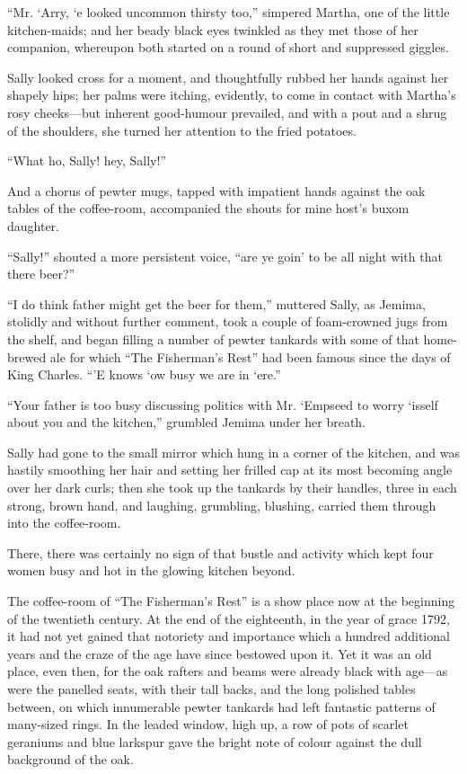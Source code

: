 \documentclass[paper=5.5in:8.5in,BCOR=7mm,twoside,DIV=calc,12pt,usegeometry,chapterprefix,endperiod,headings=big]{scrbook}
\begin{document}
\enquote{Mr. `Arry, `e looked uncommon thirsty too,} simpered Martha, one of the little kitchen-maids; and her beady black eyes twinkled as they met those of her companion, whereupon both started on a round of short and suppressed giggles.

Sally looked cross for a moment, and thoughtfully rubbed her hands against her shapely hips; her palms were itching, evidently, to come in contact with Martha's rosy cheeks---but inherent good-humour prevailed, and with a pout and a shrug of the shoulders, she turned her attention to the fried potatoes.

\enquote{What ho, Sally! hey, Sally!}

And a chorus of pewter mugs, tapped with impatient hands against the oak tables of the coffee-room, accompanied the shouts for mine host's buxom daughter.

\enquote{Sally!} shouted a more persistent voice, \enquote{are ye goin’ to be all night with that there beer?}

\enquote{I do think father might get the beer for them,} muttered Sally, as Jemima, stolidly and without further comment, took a couple of foam-crowned jugs from the shelf, and began filling a number of pewter tankards with some of that home-brewed ale for which \enquote{The Fisherman's Rest} had been famous since the days of King Charles. \enquote{’E knows `ow busy we are in `ere.}

\enquote{Your father is too busy discussing politics with Mr. `Empseed to worry `isself about you and the kitchen,} grumbled Jemima under her breath.

Sally had gone to the small mirror which hung in a corner of the kitchen, and was hastily smoothing her hair and setting her frilled cap at its most becoming angle over her dark curls; then she took up the tankards by their handles, three in each strong, brown hand, and laughing, grumbling, blushing, carried them through into the coffee-room.

There, there was certainly no sign of that bustle and activity which kept four women busy and hot in the glowing kitchen beyond.

The coffee-room of \enquote{The Fisherman's Rest} is a show place now at the beginning of the twentieth century. At the end of the eighteenth, in the year of grace 1792, it had not yet gained that notoriety and importance which a hundred additional years and the craze of the age have since bestowed upon it. Yet it was an old place, even then, for the oak rafters and beams were already black with age---as were the panelled seats, with their tall backs, and the long polished tables between, on which innumerable pewter tankards had left fantastic patterns of many-sized rings. In the leaded window, high up, a row of pots of scarlet geraniums and blue larkspur gave the bright note of colour against the dull background of the oak.
\end{document}
